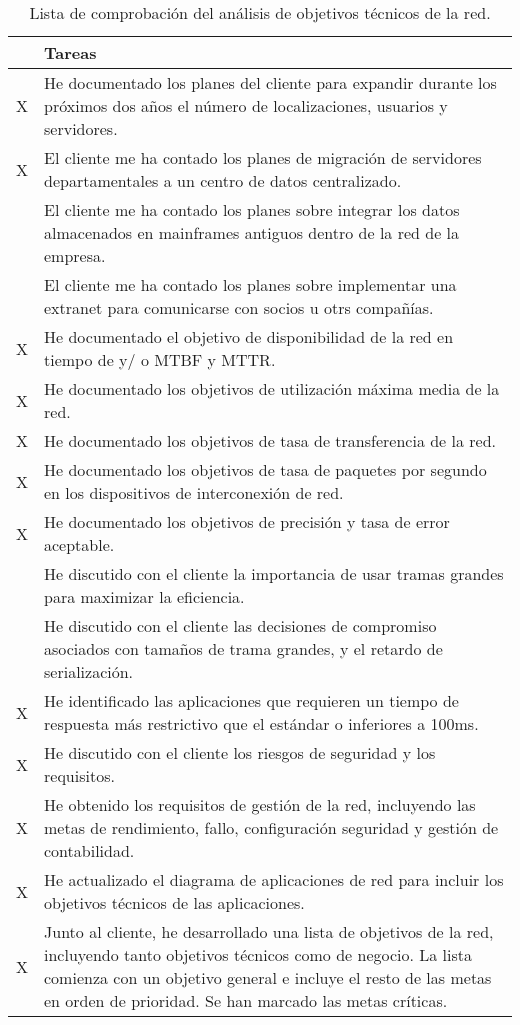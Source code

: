\begin{table}[H]
	\begin{center}
		\begin{tabular}{|c|l|}
			\hline 
			& Tareas  \\ 
			\hline \hline
			X & He documentado los planes del cliente para expandir durante los
			próximos dos años el número de localizaciones, usuarios y servidores.  \\ \hline
			X & El cliente me ha contado los planes de migración de servidores
			departamentales a un centro de datos centralizado.  \\ \hline
			& El cliente me ha contado los planes sobre integrar los datos
			almacenados en mainframes antiguos dentro de la red de la empresa.  \\ \hline
			& El cliente me ha contado los planes sobre implementar una extranet
			para comunicarse con socios u otrs compañías.  \\ \hline
			X & He documentado el objetivo de disponibilidad de la red en tiempo de y/
			o MTBF y MTTR.  \\ \hline
			X & He documentado los objetivos de utilización máxima media de la red.  \\ \hline
			X & He documentado los objetivos de tasa de transferencia de la red.  \\ \hline
			X & He documentado los objetivos de tasa de paquetes por segundo en los
			dispositivos de interconexión de red.  \\ \hline
			X & He documentado los objetivos de precisión y tasa de error aceptable.  \\ \hline
			& He discutido con el cliente la importancia de usar tramas grandes para
			maximizar la eficiencia.  \\ \hline
			& He discutido con el cliente las decisiones de compromiso asociados
			con tamaños de trama grandes, y el retardo de serialización.  \\ \hline
			X & He identificado las aplicaciones que requieren un tiempo de respuesta
			más restrictivo que el estándar o inferiores a 100ms.  \\ \hline
			X & He discutido con el cliente los riesgos de seguridad y los requisitos.  \\ \hline
			X & He obtenido los requisitos de gestión de la red, incluyendo las metas de
			rendimiento, fallo, configuración seguridad y gestión de contabilidad.  \\ \hline
			X & He actualizado el diagrama de aplicaciones de red para incluir los objetivos técnicos de las aplicaciones.  \\ \hline
			X & Junto al cliente, he desarrollado una lista de objetivos de la red,
			incluyendo tanto objetivos técnicos como de negocio. La lista
			comienza con un objetivo general e incluye el resto de las metas en
			orden de prioridad. Se han marcado las metas críticas.  \\ \hline
		\end{tabular}
		\caption{Lista de comprobación del análisis de objetivos técnicos de la red.}
		\label{tabla:tabla2}
	\end{center}
\end{table}

